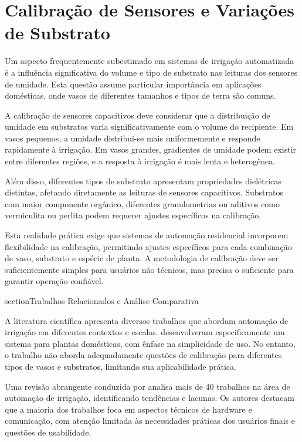 \documentclass[twoside,english,brazilian]{UNISINOSmonografia}
\begin{document}
\section{Calibração de Sensores e Variações de Substrato}

Um aspecto frequentemente subestimado em sistemas de irrigação automatizada é a influência significativa do volume e tipo de substrato nas leituras dos sensores de umidade. Esta questão assume particular importância em aplicações domésticas, onde vasos de diferentes tamanhos e tipos de terra são comuns.

A calibração de sensores capacitivos deve considerar que a distribuição de umidade em substratos varia significativamente com o volume do recipiente. Em vasos pequenos, a umidade distribui-se mais uniformemente e responde rapidamente à irrigação. Em vasos grandes, gradientes de umidade podem existir entre diferentes regiões, e a resposta à irrigação é mais lenta e heterogênea.

Além disso, diferentes tipos de substrato apresentam propriedades dielétricas distintas, afetando diretamente as leituras de sensores capacitivos. Substratos com maior componente orgânico, diferentes granulometrias ou aditivos como vermiculita ou perlita podem requerer ajustes específicos na calibração.

Esta realidade prática exige que sistemas de automação residencial incorporem flexibilidade na calibração, permitindo ajustes específicos para cada combinação de vaso, substrato e espécie de planta. A metodologia de calibração deve ser suficientemente simples para usuários não técnicos, mas precisa o suficiente para garantir operação confiável.

section{Trabalhos Relacionados e Análise Comparativa}

A literatura científica apresenta diversos trabalhos que abordam automação de irrigação em diferentes contextos e escalas.  desenvolveram especificamente um sistema para plantas domésticas, com ênfase na simplicidade de uso. No entanto, o trabalho não aborda adequadamente questões de calibração para diferentes tipos de vasos e substratos, limitando sua aplicabilidade prática.

Uma revisão abrangente conduzida por  analisa mais de 40 trabalhos na área de automação de irrigação, identificando tendências e lacunas. Os autores destacam que a maioria dos trabalhos foca em aspectos técnicos de hardware e comunicação, com atenção limitada às necessidades práticas dos usuários finais e questões de usabilidade.
\end{document}
